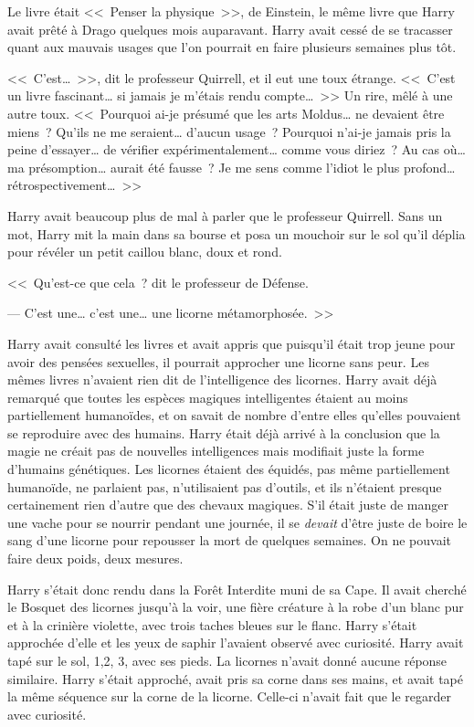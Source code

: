Le livre était <<~Penser la physique~>>, de Einstein, le même livre que Harry avait prêté à Drago quelques mois auparavant. Harry avait cessé de se tracasser quant aux mauvais usages que l'on pourrait en faire plusieurs semaines plus tôt.

<<~C'est…~>>, dit le professeur Quirrell, et il eut une toux étrange. <<~C'est un livre fascinant… si jamais je m'étais rendu compte…~>> Un rire, mêlé à une autre toux. <<~Pourquoi ai-je présumé que les arts Moldus… ne devaient être miens~? Qu'ils ne me seraient… d'aucun usage~? Pourquoi n'ai-je jamais pris la peine d'essayer… de vérifier expérimentalement… comme vous diriez~? Au cas où… ma présomption… aurait été fausse~? Je me sens comme l'idiot le plus profond… rétrospectivement…~>>

Harry avait beaucoup plus de mal à parler que le professeur Quirrell. Sans un mot, Harry mit la main dans sa bourse et posa un mouchoir sur le sol qu'il déplia pour révéler un petit caillou blanc, doux et rond.

<<~Qu'est-ce que cela~? dit le professeur de Défense.

--- C'est une… c'est une… une licorne métamorphosée.~>>

Harry avait consulté les livres et avait appris que puisqu'il était trop jeune pour avoir des pensées sexuelles, il pourrait approcher une licorne sans peur. Les mêmes livres n'avaient rien dit de l'intelligence des licornes. Harry avait déjà remarqué que toutes les espèces magiques intelligentes étaient au moins partiellement humanoïdes, et on savait de nombre d'entre elles qu'elles pouvaient se reproduire avec des humains. Harry était déjà arrivé à la conclusion que la magie ne créait pas de nouvelles intelligences mais modifiait juste la forme d'humains génétiques. Les licornes étaient des équidés, pas même partiellement humanoïde, ne parlaient pas, n'utilisaient pas d'outils, et ils n'étaient presque certainement rien d'autre que des chevaux magiques. S'il était juste de manger une vache pour se nourrir pendant une journée, il se \emph{devait} d'être juste de boire le sang d'une licorne pour repousser la mort de quelques semaines. On ne pouvait faire deux poids, deux mesures.

Harry s'était donc rendu dans la Forêt Interdite muni de sa Cape. Il avait cherché le Bosquet des licornes jusqu'à la voir, une fière créature à la robe d'un blanc pur et à la crinière violette, avec trois taches bleues sur le flanc. Harry s'était approchée d'elle et les yeux de saphir l'avaient observé avec curiosité. Harry avait tapé sur le sol, 1,2, 3, avec ses pieds. La licornes n'avait donné aucune réponse similaire. Harry s'était approché, avait pris sa corne dans ses mains, et avait tapé la même séquence sur la corne de la licorne. Celle-ci n'avait fait que le regarder avec curiosité.

